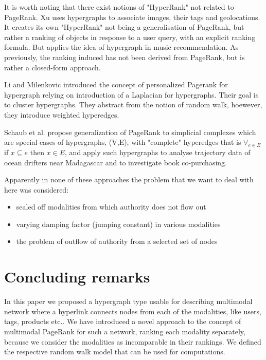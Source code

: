 \documentclass{fundam}
\begin{document}
It is worth noting that there exist notions of "HyperRank" not related to PageRank.
Xu \cite{Xu:2012} uses hypergraphs to associate images, their tags and geolocations.
It creates its own "HyperRank" not being a generalisation of PageRank, but rather a ranking of objects in response to a user query, with an explicit ranking formula. But
\cite{Bu:2010} applies the idea of hypergraph in music recommendation.
As previously, the ranking induced has not been derived from PageRank, but is rather a closed-form approach.

\eject
Li and Milenkovic \cite{Li:2018:hglapl} introduced the concept of personalized Pagerank for hypergraph relying on introduction of a Laplacian for hypergraphs. Their goal is to cluster hypergraphs. They abstract from the notion of random walk, hoewever, they introduce weighted hyperedges.

Schaub et al. \cite{Schaub:2018:simplicialComplexes} propose generalization of PageRank to simplicial complexes which are special cases of hypergraphs, (V,E),  with "complete" hyperedges that is $\forall_{e\in E}$ if $ x \subseteq e $ then $x \in E$, and apply such hypergraphs to analyse
trajectory data of ocean drifters near Madagascar and to investigate  book co-purchasing.

\medskip
Apparently in none of these approaches the problem that we want to deal with here was considered:
\begin{itemize}
\itemsep=0.95pt
\item sealed off modalities from which authority does not flow out
\item varying damping  factor (jumping constant) in various modalities
\item the problem of outflow of authority from a selected set of nodes
\end{itemize}


\section{Concluding remarks}\label{sec-conclusions}

In this paper we proposed   a hypergraph type usable for describing multimodal network where a hyperlink connects nodes from each of the modalities, like users, tags, products etc..
We have introduced a novel approach to the concept of
multimodal PageRank for such a network, ranking each modality separately, because we consider the modalities as incomparable in their rankings.
We  defined the respective random walk model that can be used for computations.
\end{document}

